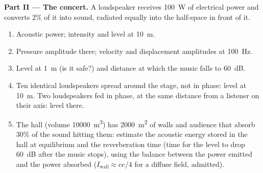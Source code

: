 \begin{problem}
\medskip
\noindent\textbf{Part II --- The concert.}
A loudspeaker receives \qty{100}{W} of electrical power and converts
$2\%$ of it into sound, radiated equally into the half-space in front
of it.
\begin{enumerate}[resume]
  \item Acoustic power; intensity and level at \qty{10}{m}.
  \item Pressure amplitude there; velocity and displacement amplitudes
        at \qty{100}{Hz}.
  \item Level at \qty{1}{m} (is it safe?) and distance at which the music
        falls to \qty{60}{dB}.
  \item Ten identical loudspeakers spread around the stage, not in
        phase: level at \qty{10}{m}. Two loudspeakers fed in phase, at the
        same distance from a listener on their axis: level there.
  \item The hall (volume \qty{10000}{m^3}) has \qty{2000}{m^2} of walls and audience that absorb $30\%$ of the
        sound hitting them: estimate the acoustic energy stored in the
        hall at equilibrium and the reverberation time (time for the
        level to drop \qty{60}{dB} after the music stops), using the
        balance between the power emitted and the power absorbed
        ($I_{\text{wall}} \approx ce/4$ for a diffuse field, admitted).
\end{enumerate}


\end{problem}

